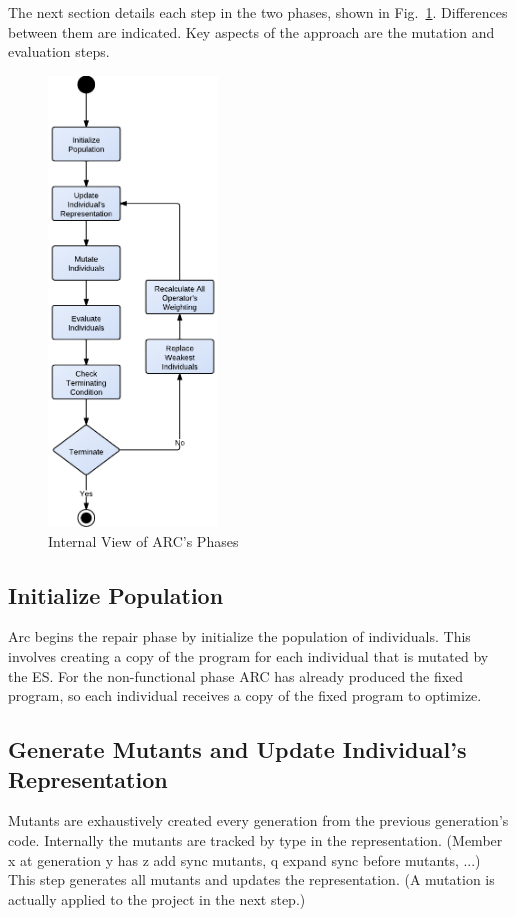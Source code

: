 \documentclass{llncs}
\begin{document}
The next section details each step in the two phases, shown in
Fig.~\ref{fig:phases_internals}. Differences between them are indicated. Key
aspects of the approach are the mutation and evaluation steps.

\begin{figure}[!h]
  \centering
  \includegraphics[width=4.50cm]{figures/phases.pdf}
  \caption{Internal View of ARC's Phases}
  \label{fig:phases_internals}
\end{figure}

\subsection{Initialize Population}
\label{sec:initialize_population}

Arc begins the repair phase by initialize the population of individuals. This
involves creating a copy of the program for each individual that is mutated by
the ES. For the non-functional phase ARC has already produced the fixed
program, so each individual receives a copy of the fixed program to optimize.

\subsection{Generate Mutants and Update Individual's Representation}
\label{sec:update_individual_representation}

Mutants are exhaustively created every generation from the previous
generation's code. Internally the mutants are tracked by type in the
representation. (Member x at generation y has z add sync mutants, q expand sync
before mutants, ...) This step generates all mutants and updates the
representation. (A mutation is actually applied to the project in the next
step.)
\end{document}

